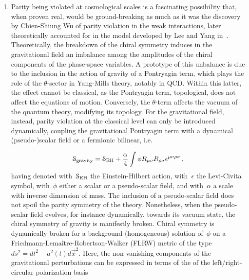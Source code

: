 \documentclass[reqno,11pt]{amsart}
\numberwithin{equation}{section}
\newcommand{\1}{\mbox{\rm 1 \hspace{-1.05 em} 1}}
\newcommand\Felix[1]{}
\begin{document}
\begin{enumerate}[leftmargin=2em]
Gauging the dark photon with the Majoron also provides an interesting possibility for phenomenology. This is in principle a scenario that enables to encode the paradigm developed in~\cite{Senjanovic:1975rk}, but the exact implementation of which will anyway require a detailed study.

\item
Parity being violated at cosmological scales is a fascinating possibility that, when proven real, would be ground-breaking as much as it was the discovery by Chien-Shiung Wu of parity violation in the weak interactions, later theoretically accounted for in the model developed by Lee and Yang in~\cite{Lee:1956qn}. Theoretically, the breakdown of the chiral symmetry induces in the gravitational field an imbalance among the amplitudes of the chiral components of the phase-space variables. A prototype of this unbalance is due to the inclusion in the action of gravity of a Pontryagin term, which plays the role of the $\theta$-sector in Yang-Mills theory, notably in QCD. Within this latter, the effect cannot be classical, as the Pontryagin term, topological, does not affect the equations of motion. Conversely, the $\theta$-term affects the vacuum of the quantum theory, modifying its topology. For the gravitational field, instead, parity violation at the classical level can only be introduced dynamically, coupling the gravitational Pontryagin term with a dynamical (pseudo-)scalar field or a fermionic bilinear, i.e.
\Felix{What is the $R_{\mu \nu}$ here? It's a field strength, right?}
\begin{equation}  \label{lagrav}
\mathcal{S}_{\rm gravity} = \mathcal{S}_{\rm EH} + \frac{\alpha}{4} \int \phi R_{\mu \nu} R_{\rho \sigma} \epsilon^{\mu \nu \rho \sigma}\,,
\end{equation}
having denoted with~$\mathcal{S}_{\rm EH}$ the Einstein-Hilbert action, with~$\epsilon$ the Levi-Civita symbol, with~$\phi$ either a scalar or a pseudo-scalar field, and with~$\alpha$ a scale with inverse dimension of mass. The inclusion of a pseudo-scalar field does not spoil the parity symmetry of the theory. Nonetheless, when the pseudo-scalar field evolves, for instance dynamically, towards its vacuum state, the chiral symmetry of gravity is manifestly broken. Chiral symmetry is dynamically broken for a background (homogeneous) solution of~$\phi$ on a Friedmann-Lema\^itre-Robertson-Walker (FLRW) metric of the type~$ds^2=dt^2-a^2(t)d\vec{x}^2$. Here, the non-vanishing components of the gravitational perturbations can be expressed in terms of the of the left/right-circular polarization basis 

\end{enumerate}
\end{document}
